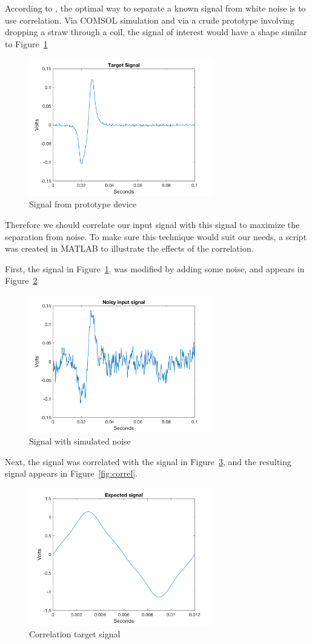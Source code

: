 \documentclass[10pt, journal]{IEEEtran}
\begin{document}
According to \cite{dspguide}, the optimal way to separate a known
signal from white noise is to use correlation. Via COMSOL simulation
and via a crude prototype involving dropping a straw through a coil,
the signal of interest would have a shape similar to Figure
\,\ref{fig:input} \par
\begin{figure}[ht!]
  \includegraphics[width=8cm]{../matlab/plot5.png}
  \caption{Signal from prototype device}
  \label{fig:input}
  \end{figure}
Therefore we should
correlate our input signal with this signal to maximize the separation
from noise. To make sure this technique would suit our needs, a script
was created in MATLAB to illustrate the effects of the correlation.

First, the signal in Figure \,\ref{fig:input}. was modified by adding some noise, and appears in Figure \,\ref{fig:noisy}
\begin{figure}[h]
  \includegraphics[width=8cm]{../matlab/plot1.png}
  \caption{Signal with simulated noise}
  \label{fig:noisy}
\end{figure}
Next, the signal was correlated with the signal in Figure \,\ref{fig:target}, and the resulting signal appears in Figure \,\ref{fig:correl}.

\begin{figure}[h]
  \includegraphics[width=8cm]{../matlab/plot2.png}
  \caption{Correlation target signal}
  \label{fig:target}
\end{figure}
\end{document}
